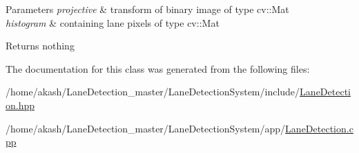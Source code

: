 \begin{DoxyParams}{Parameters}
{\em projective} & transform of binary image of type cv\+::\+Mat \\
\hline
{\em histogram} & containing lane pixels of type cv\+::\+Mat \\
\hline
\end{DoxyParams}
\begin{DoxyReturn}{Returns}
nothing 
\end{DoxyReturn}


The documentation for this class was generated from the following files\+:\begin{DoxyCompactItemize}
\item 
/home/akash/\+Lane\+Detection\+\_\+master/\+Lane\+Detection\+System/include/\hyperlink{LaneDetection_8hpp}{Lane\+Detection.\+hpp}\item 
/home/akash/\+Lane\+Detection\+\_\+master/\+Lane\+Detection\+System/app/\hyperlink{LaneDetection_8cpp}{Lane\+Detection.\+cpp}\end{DoxyCompactItemize}
